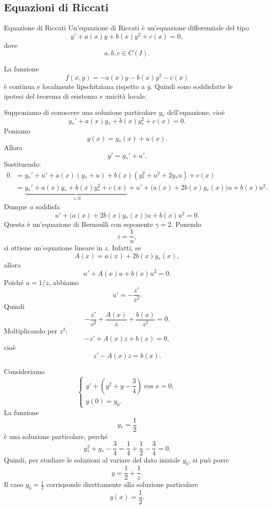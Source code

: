 \documentclass[a4paper]{article}
\begin{document}
\subsection{Equazioni di Riccati}

\begin{radioactive}
\begin{snippetdefinition}{Equazione di Riccati}
    Un'equazione di Riccati è un'equazione differenziale del tipo
    \[
        y'+a(x)y+b(x)y^2+c(x)=0,
    \]
    dove
    \[
        a,b,c\in C(I).
    \]
\end{snippetdefinition}
\end{radioactive}

\begin{radioactive}
La funzione
\[
    f(x,y)=-a(x)y-b(x)y^2-c(x)
\]
è continua e localmente lipschitziana rispetto a \(y\). Quindi sono soddisfatte le ipotesi del teorema di esistenza e unicità locale.

Supponiamo di conoscere una soluzione particolare \(y_\ast\) dell'equazione, cioè
\[
    y_\ast'+a(x)y_\ast+b(x)y_\ast^2+c(x)=0.
\]
Poniamo
\[
    y(x)=y_\ast(x)+u(x).
\]
Allora
\[
    y'=y_\ast'+u'.
\]
Sostituendo:
\begin{align*}
    0
    &=
    y_\ast'+u'
    +a(x)(y_\ast+u)
    +b(x)(y_\ast^2+u^2+2y_\ast u)
    +c(x)\\
    &=
    \underbrace{
        y_\ast'+a(x)y_\ast+b(x)y_\ast^2+c(x)
    }_{=0}
    +
    u'
    +
    \bigl(a(x)+2b(x)y_\ast(x)\bigr)u
    +
    b(x)u^2.
\end{align*}
Dunque \(u\) soddisfa
\[
    u'
    +
    \bigl(a(x)+2b(x)y_\ast(x)\bigr)u
    +
    b(x)u^2
    =0.
\]
Questa è un'equazione di Bernoulli con esponente \(\gamma=2\). Ponendo
\[
    z=\frac{1}{u},
\]
si ottiene un'equazione lineare in \(z\). Infatti, se
\[
    A(x)=a(x)+2b(x)y_\ast(x),
\]
allora
\[
    u'+A(x)u+b(x)u^2=0.
\]
Poiché \(u=1/z\), abbiamo
\[
    u'=-\frac{z'}{z^2}.
\]
Quindi
\[
    -\frac{z'}{z^2}+\frac{A(x)}{z}+\frac{b(x)}{z^2}=0.
\]
Moltiplicando per \(z^2\):
\[
    -z'+A(x)z+b(x)=0,
\]
cioè
\[
    z'-A(x)z=b(x).
\]
\end{radioactive}

\begin{radioactive}
\begin{snippetexample}{}
    Consideriamo
    \[
        \begin{cases}
            y'+\left(y^2+y-\dfrac{3}{4}\right)\cos x=0,\\
            y(0)=y_0.
        \end{cases}
    \]
    La funzione
    \[
        y_\ast=\frac{1}{2}
    \]
    è una soluzione particolare, perché
    \[
        y_\ast^2+y_\ast-\frac{3}{4}
        =
        \frac{1}{4}+\frac{1}{2}-\frac{3}{4}
        =
        0.
    \]
    Quindi, per studiare le soluzioni al variare del dato iniziale \(y_0\), si può porre
    \[
        y=\frac{1}{2}+\frac{1}{z}.
    \]
    Il caso \(y_0=\frac{1}{2}\) corrisponde direttamente alla soluzione particolare
    \[
        y(x)=\frac{1}{2}.
    \]
\end{snippetexample}
\end{radioactive}
\end{document}
